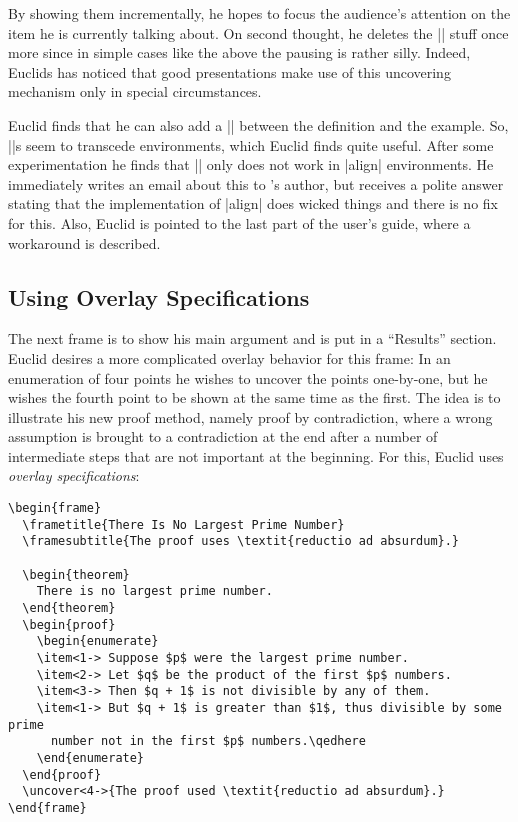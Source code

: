 By showing them incrementally, he hopes to focus the audience's attention on the item he is currently talking about. On second thought, he deletes the |\pause| stuff once more since in simple cases like the above the pausing is rather silly. Indeed, Euclids has noticed that good presentations make use of this uncovering mechanism only in special circumstances.

Euclid finds that he can also add a |\pause| between the definition and the example. So, |\pause|s seem to transcede environments, which Euclid finds quite useful. After some experimentation he finds that |\pause| only does not work in |align| environments. He immediately writes an email about this to \beamer's author, but receives a polite answer stating that the implementation of |align| does wicked things and there is no fix for this. Also, Euclid is pointed to the last part of the user's guide, where a workaround is described.


\subsection{Using Overlay Specifications}

The next frame is to show his main argument and is put in a ``Results'' section. Euclid desires a more complicated overlay behavior for this frame: In an enumeration of four points he wishes to uncover the points one-by-one, but he wishes the fourth point to be shown at the same time as the first. The idea is to illustrate his new proof method, namely proof by contradiction, where a wrong assumption is brought to a contradiction at the end after a number of intermediate steps that are not important at the beginning. For this, Euclid uses \emph{overlay specifications}:
\begin{verbatim}
\begin{frame}
  \frametitle{There Is No Largest Prime Number}
  \framesubtitle{The proof uses \textit{reductio ad absurdum}.}

  \begin{theorem}
    There is no largest prime number.
  \end{theorem}
  \begin{proof}
    \begin{enumerate}
    \item<1-> Suppose $p$ were the largest prime number.
    \item<2-> Let $q$ be the product of the first $p$ numbers.
    \item<3-> Then $q + 1$ is not divisible by any of them.
    \item<1-> But $q + 1$ is greater than $1$, thus divisible by some prime
      number not in the first $p$ numbers.\qedhere
    \end{enumerate}
  \end{proof}
  \uncover<4->{The proof used \textit{reductio ad absurdum}.}
\end{frame}
\end{verbatim}

